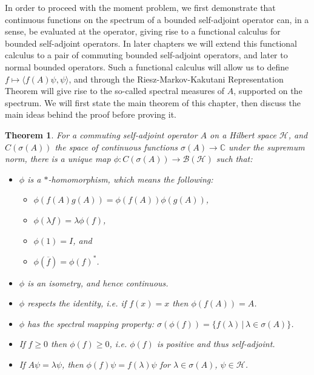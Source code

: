 \documentclass[12pt,oneside]{report}
\newtheorem{thm}{Theorem}[chapter]
\begin{document}
In order to proceed with the moment problem, we first demonstrate that continuous functions on the spectrum of a bounded self-adjoint operator can, in a sense, be evaluated at the operator, giving rise to a functional calculus for bounded self-adjoint operators. In later chapters we will extend this functional calculus to a pair of commuting bounded self-adjoint operators, and later to normal bounded operators. Such a functional calculus will allow us to define $f \mapsto \langle f(A) \psi, \psi \rangle$, and through the Riesz-Markov-Kakutani Representation Theorem will give rise to the so-called spectral measures of $A$, supported on the spectrum. We will first state the main theorem of this chapter, then discuss the main ideas behind the proof before proving it.

\begin{thm}
    For a commuting self-adjoint operator $A$ on a Hilbert space $\mathscr{H}$, and $C(\sigma(A))$ the space of continuous functions $\sigma(A) \to \mathbb{C}$ under the supremum norm, there is a unique map $\phi: C(\sigma(A)) \to \mathscr{B}(\mathscr{H})$ such that:
    \begin{itemize}
        \item $\phi$ is a $*$-homomorphism, which means the following:
        \begin{itemize}
            \item $\phi(f(A)g(A)) = \phi(f(A))\phi(g(A))$,
            \item $\phi(\lambda f) = \lambda \phi(f)$,
            \item $\phi(1) = I$, and
            \item $\phi(\overline{f}) = \phi(f)^{*}$.
        \end{itemize}
        \item $\phi$ is an isometry, and hence continuous.
        \item $\phi$ respects the identity, i.e. if $f(x) = x$ then $\phi(f(A)) = A$.
        \item $\phi$ has the spectral mapping property: $\sigma(\phi(f)) = \{ f(\lambda) \, | \, \lambda \in \sigma(A) \}$.
        \item If $f \geq 0$ then $\phi(f) \geq 0$, i.e. $\phi(f)$ is positive and thus self-adjoint.
        \item If $A\psi = \lambda \psi$, then $\phi(f)\psi = f(\lambda)\psi$ for $\lambda \in \sigma(A)$, $\psi \in \mathscr{H}$.
    \end{itemize}
\end{thm}
\end{document}
